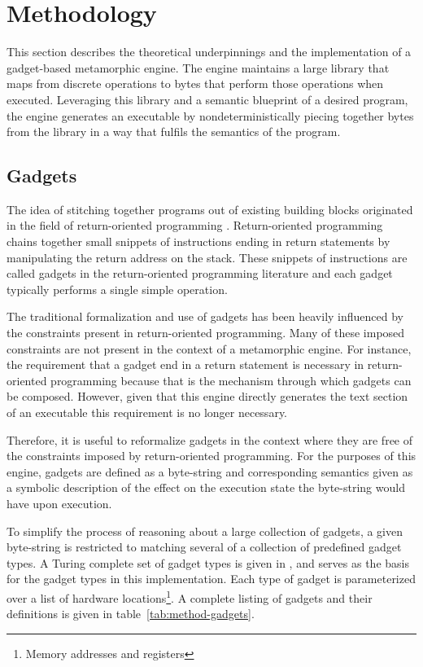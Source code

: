 \chapter{Methodology}

    This section describes the theoretical underpinnings and the implementation
    of a gadget-based metamorphic engine. The engine maintains a large library
    that maps from discrete operations to bytes that perform those operations
    when executed. Leveraging this library and a semantic blueprint of a desired
    program, the engine generates an executable by nondeterministically piecing
    together bytes from the library in a way that fulfils the semantics of the
    program.

    \section{Gadgets}
    
    The idea of stitching together programs out of existing building blocks
    originated in the field of return-oriented programming \cite{rop_geo}.
    Return-oriented programming chains together small snippets of instructions
    ending in return statements by manipulating the return address on the stack.
    These snippets of instructions are called gadgets in the return-oriented
    programming literature and each gadget typically performs a single simple
    operation.

    The traditional formalization and use of gadgets has been heavily influenced
    by the constraints present in return-oriented programming. Many of these
    imposed constraints are not present in the context of a metamorphic engine.
    For instance, the requirement that a gadget end in a return statement is
    necessary in return-oriented programming because that is the mechanism
    through which gadgets can be composed. However, given that this engine
    directly generates the text section of an executable this requirement is no
    longer necessary.

    Therefore, it is useful to reformalize gadgets in the context where they are
    free of the constraints imposed by return-oriented programming. For the
    purposes of this engine, gadgets are defined as a byte-string and
    corresponding semantics given as a symbolic description of the effect on the
    execution state the byte-string would have upon execution.

    To simplify the process of reasoning about a large collection of gadgets, a
    given byte-string is restricted to matching several of a collection of
    predefined gadget types. A Turing complete set of gadget types is given in
    \cite{franken}, and serves as the basis for the gadget types in this
    implementation. Each type of gadget is parameterized over a list of hardware
    locations\footnote{Memory addresses and registers}. A complete listing of
    gadgets and their definitions is given in table~\ref{tab:method-gadgets}.

